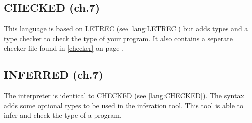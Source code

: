 \documentclass[../codeprint.tex]{subfiles}
\begin{document}
\subsection{CHECKED (ch.7)}
\label{lang:CHECKED}
This language is based on LETREC (see \autoref{lang:LETREC}) but adds types and a type checker to check the type of your program.
It also contains a seperate checker file found in \autoref{checker} on page \pageref{checker}.




\subsection{INFERRED (ch.7)}
The interpreter is identical to CHECKED (see \autoref{lang:CHECKED}). The syntax adds some optional types to be used in the inferation tool. This tool is able to infer and check the type of a program.


\end{document}
